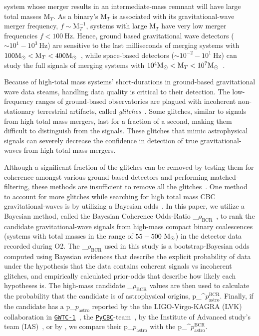 \documentclass[%
 nofootinbib,
 amsmath,amssymb,
 aps,
 twocolumn,
 superscriptaddress
]{revtex4-2}
\newcommand{\pycbc}{{\sc \href{https://pycbc.org/}{\texttt{PyCBC}}}\xspace}
\newcommand{\GWTC}{{\sc \href{https://ui.adsabs.harvard.edu/abs/2019PhRvX...9c1040A/abstract}{\texttt{GWTC-1}}}\xspace}
\newcommand{\fancytext}[1]{{\relax\ifmmode#1\else $#1$\fi}\xspace}
\newcommand{\mathcmd}[1]{{\sc \relax\ifmmode#1\else $#1$\fi}\xspace}
\newcommand{\bcr}{\mathcmd{\rho_\text{BCR}}}
\newcommand{\msun}{\mathcmd{\text{M}_\odot}}
\newcommand{\pastro}{\fancytext{p_\text{astro}}}
\newcommand{\pastrobcr}{\fancytext{p_\text{astro}^{\text{BCR}}}}
\begin{document}
system whose merger results in an intermediate-mass remnant will have large total masses $\text{M}_{T}$. As a binary's $\text{M}_{T}$ is associated with its gravitational-wave merger frequency, $f\sim \text{M}_{T}^{-1}$, systems with large $\text{M}_{T}$ have very low merger frequencies $f < 100\ \text{Hz}$. Hence, ground based gravitational wave detectors ($\sim 10^1 - 10^3\ \text{Hz}$) are sensitive to the last milliseconds of merging systems with $100 \msun < \text{M}_{T} < 400 \msun$~\cite{LIGOScientificCollaboration:2015:CQGra, Martynov:2016:PhRvD, Moore_2014}, while space-based detectors ($\sim 10^{-2} - 10^1\ \text{Hz}$) can study the full signals of merging systems with $10^4 \msun < \text{M}_{T} < 10^7 \msun$~\cite{ Moore_2014, Lu:2019:PhRvD}. 

Because of high-total mass systems' short-durations in ground-based gravitational wave data steams, handling data quality is critical to their detection. The low-frequency ranges of ground-based observatories are plagued with incoherent non-stationary terrestrial artifacts, called \textit{glitches}~\cite{ pycbc_short_duration_transients, pe_with_glitch, blip_glitches}. Some glitches, similar to signals from high total mass mergers, last for a fraction of a second, making them difficult to distinguish from the signals. These glitches that mimic astrophysical signals can severely decrease the confidence in detection of true gravitational-waves from high total mass mergers. 

Although a significant fraction of the glitches can be removed by testing them for coherence amongst various ground based detectors and performing matched-filtering, these methods are insufficient to remove all the glitches~\cite{ pycbc_short_duration_transients, pe_with_glitch, blip_glitches}. One method to account for more glitches while searching for high total mass CBC gravitational-waves is by utilizing a Bayesian odds~\cite{bci, kanner2016leveraging, BCR1, BCR2, bcr_gw151216, bayesian_odds}. In this paper, we utilize a Bayesian method, called the Bayesian Coherence Odds-Ratio \bcr~\cite{BCR1}, to rank the candidate gravitational-wave signals from high-mass compact binary coalescences (systems with total masses in the range of $55-500\ \msun$) in the detector data recorded during O2. The \bcr used in this study is a bootstrap-Bayesian odds computed using Bayesian evidences that describe the explicit probability of data under the hypothesis that the data contains coherent signals vs incoherent glitches, and empirically calculated prior-odds that describe how likely each hypotheses is. The high-mass candidate \bcr values are then used to calculate the probability that the candidate is of astrophysical origins, \pastrobcr. Finally, if the candidate has a \pastro reported by the the LIGO-Virgo-KAGRA (LVK) collaboration in \GWTC~\cite{GWTC1}, the \pycbc-team~\cite{pycbc_code, pycbc_og0, pycbc_og1, pycbc_og2, pycbc_og3, pycbc_og4, pycbc_og5, pycbc_og6, pycbc_single_det, pycbc_ogc_2}, by the Institute of Advanced study's team (IAS)~\cite{IAS0, IAS1, IAS2}, or by \citet{bayesian_odds}, we compare their \pastro with the \pastrobcr.
\end{document}
